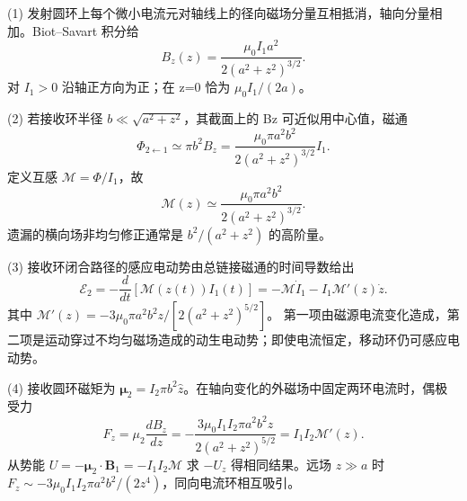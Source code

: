 (1) 发射圆环上每个微小电流元对轴线上的径向磁场分量互相抵消，轴向分量相加。Biot–Savart 积分给
\[
B_z(z)=\frac{\mu_0I_1a^2}{2(a^2+z^2)^{3/2}} .
\]
对 \(I_{1}>0\) 沿轴正方向为正；在 z=0 恰为 \(\mu_0I_1/(2a)\)。

(2) 若接收环半径 \(b\ll\sqrt{a^2+z^2}\)，其截面上的 Bz 可近似用中心值，磁通
\[
\Phi_{2\leftarrow1}\simeq\pi b^2 B_z
=\frac{\mu_0\pi a^2b^2}{2(a^2+z^2)^{3/2}}I_1.
\]
定义互感 \(\mathcal M=\Phi/I_1\)，故
\[
\mathcal M(z)\simeq\frac{\mu_0\pi a^2b^2}{2(a^2+z^2)^{3/2}}.
\]
遗漏的横向场非均匀修正通常是 \(b^2/(a^2+z^2)\) 的高阶量。

(3) 接收环闭合路径的感应电动势由总链接磁通的时间导数给出
\[
\mathcal E_2=-\frac{d}{dt}[\mathcal M(z(t))I_1(t)]
=-\mathcal M\dot I_1-I_1\mathcal M'(z)\dot z.
\]
其中
\(\mathcal M'(z)=-3\mu_0\pi a^2b^2z/[2(a^2+z^2)^{5/2}]\)。
第一项由磁源电流变化造成，第二项是运动穿过不均匀磁场造成的动生电动势；即使电流恒定，移动环仍可感应电动势。

(4) 接收圆环磁矩为 \(\boldsymbol\mu_2=I_2\pi b^2\hat z\)。在轴向变化的外磁场中固定两环电流时，偶极受力
\[
F_z=\mu_2\frac{dB_z}{dz}
=-\frac{3\mu_0I_1I_2\pi a^2b^2z}{2(a^2+z^2)^{5/2}}
=I_1I_2\mathcal M'(z).
\]
从势能 \(U=-\boldsymbol\mu_2\cdot\boldsymbol B_1=-I_1I_2\mathcal M\) 求 \(-U_z\) 得相同结果。远场 \(z\gg a\) 时 \(F_z\sim-3\mu_0I_1I_2\pi a^2b^2/(2z^4)\)，同向电流环相互吸引。
